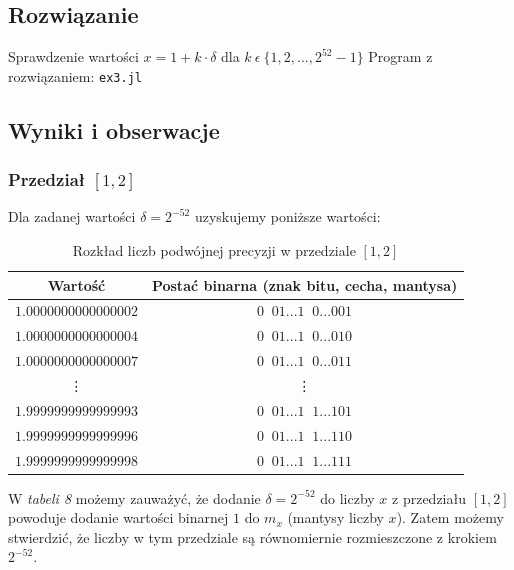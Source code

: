 \documentclass[12pt]{article}
\begin{document}
    \subsection*{Rozwiązanie}
        Sprawdzenie wartości $x = 1 + k \cdot \delta$ dla $k \: \epsilon \: \{1, 2, ..., 2^{52}-1\}$
        \newline\newline
        Program z rozwiązaniem: \texttt{ex3.jl}
        \newline

    \subsection*{Wyniki i obserwacje}
        \subsubsection*{Przedział $[1, 2]$}
            Dla zadanej wartości $\delta = 2^{-52}$ uzyskujemy poniższe wartości:

            \begin{table}[h!]
                \centering
                \begin{tabularx}{0.74\textwidth}{c c}
                    \hline
                    Wartość & Postać binarna (znak bitu, cecha, mantysa) \\
                    \hline
                    $1.0000000000000002$ & $0\;\;01...1\;\;0...001$ \\
                    $1.0000000000000004$ & $0\;\;01...1\;\;0...010$ \\
                    $1.0000000000000007$ & $0\;\;01...1\;\;0...011$ \\
                    \vdots & \vdots \\
                    $1.9999999999999993$ & $0\;\;01...1\;\;1...101$ \\
                    $1.9999999999999996$ & $0\;\;01...1\;\;1...110$ \\
                    $1.9999999999999998$ & $0\;\;01...1\;\;1...111$ \\
                    \hline
                \end{tabularx}
                \caption{Rozkład liczb podwójnej precyzji w przedziale $[1, 2]$}
                \label{table:arrangement_in_1_2}
            \end{table}

            \noindent W \textit{tabeli 8} możemy zauważyć, że dodanie $\delta = 2^{-52}$ do liczby $x$ z przedziału $[1, 2]$
            powoduje dodanie wartości binarnej $1$ do $m_x$ (mantysy liczby $x$). Zatem możemy stwierdzić, że
            liczby w tym przedziale są równomiernie rozmieszczone z krokiem $2^{-52}$.
            \newline
\end{document}
